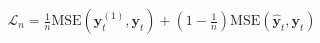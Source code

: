 \documentclass[10pt]{article}
\begin{document}
\begin{align*}\mathcal{L}_n = \frac{1}{n} \mathrm{MSE}(\mathbf{y}_t^{(1)}, \mathbf{y}_t) + \left(1 - \frac{1}{n}\right) \mathrm{MSE}(\hat{\mathbf{y}}_t, \mathbf{y}_t)\end{align*}
\end{document}
